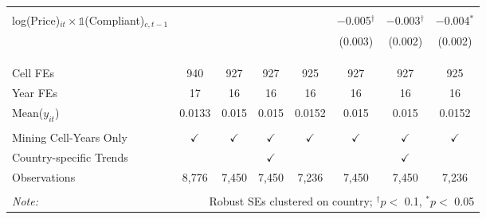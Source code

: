 \begin{table}[ht!]
\begin{tabular}{@{\extracolsep{0pt}}lccccccc}
  & & & & & & & \\ 
 log(Price)$_{it} \times \mathbb{1}$(Compliant)$_{c, t - 1}$ &  &  &  &  & $-$0.005$^{\dagger}$ & $-$0.003$^{\dagger}$ & $-$0.004$^{*}$ \\ 
  &  &  &  &  & (0.003) & (0.002) & (0.002) \\ 
  & & & & & & & \\ 
\hline \\[-1.8ex] 
\hline \\[-1.8ex] Cell FEs & 940 & 927 & 927 & 925 & 927 & 927 & 925 \\ 
Year FEs & 17 & 16 & 16 & 16 & 16 & 16 & 16 \\ 
Mean($y_{it}$) & 0.0133 & 0.015 & 0.015 & 0.0152 & 0.015 & 0.015 & 0.0152 \\ 
\hline \\[-1.8ex] Mining Cell-Years Only & $\checkmark$ & $\checkmark$ & $\checkmark$ & $\checkmark$ & $\checkmark$ & $\checkmark$ & $\checkmark$ \\ 
Country-specific Trends &  &  & $\checkmark$ &  &  & $\checkmark$ &  \\ 
Observations & 8,776 & 7,450 & 7,450 & 7,236 & 7,450 & 7,450 & 7,236 \\ 
\hline 
\hline \\[-1.8ex] 
\textit{Note:}  & \multicolumn{7}{r}{Robust SEs clustered on country; $^{\dagger} p <$ 0.1, $^*p <$ 0.05} \\ 
\end{tabular} 
\end{table} 
